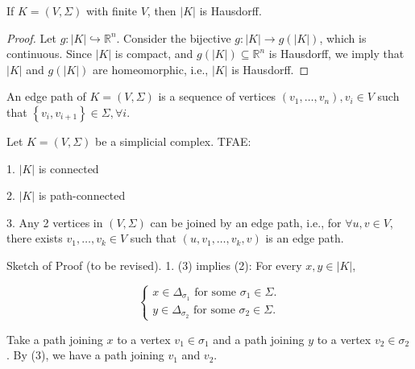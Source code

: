 \begin{proposition} If \(K = \left( {V,\Sigma }\right)\) with finite \(V\), then \(\left| K\right|\) is Hausdorff.
\end{proposition}

\begin{proof} Let \(g: \left| K\right| \hookrightarrow  {\mathbb{R}}^{n}\). Consider the bijective \(g: \left| K\right|  \rightarrow  g\left( \left| K\right| \right)\), which is continuous.
Since \(\left| K\right|\) is compact, and \(g\left( \left| K\right| \right)  \subseteq  {\mathbb{R}}^{n}\) is Hausdorff, we imply that \(\left| K\right|\) and \(g\left( \left| K\right| \right)\) are homeomorphic, i.e., \(\left| K\right|\) is Hausdorff.
\end{proof}

\begin{definition} \label{def:edge_path} An edge path of \(K = \left( {V,\Sigma }\right)\) is a sequence of vertices \(\left( {{v}_{1},\ldots,{v}_{n}}\right),{v}_{i} \in  V\) such that \(\left\{  {{v}_{i},{v}_{i + 1}}\right\}   \in  \Sigma,\forall i\).
\end{definition}

\begin{proposition} Let \(K = \left( {V,\Sigma }\right)\) be a simplicial complex. TFAE:

1. \(\left| K\right|\) is connected

2. \(\left| K\right|\) is path-connected

3. Any 2 vertices in \(\left( {V,\Sigma }\right)\) can be joined by an edge path, i.e., for \(\forall u,v \in  V\), there exists \({v}_{1},\ldots,{v}_{k} \in  V\) such that \(\left( {u,{v}_{1},\ldots,{v}_{k},v}\right)\) is an edge path.
\end{proposition}

Sketch of Proof (to be revised). 1. (3) implies (2): For every \(x,y \in  \left| K\right|\),

\[
\left\{  \begin{array}{l} x \in  {\Delta }_{{\sigma }_{1}}\text{ for some }{\sigma }_{1} \in  \Sigma. \\  y \in  {\Delta }_{{\sigma }_{2}}\text{ for some }{\sigma }_{2} \in  \Sigma. \end{array}\right.
\]

Take a path joining \(x\) to a vertex \({v}_{1} \in  {\sigma }_{1}\) and a path joining \(y\) to a vertex \({v}_{2} \in  {\sigma }_{2}\). By (3), we have a path joining \({v}_{1}\) and \({v}_{2}\).

